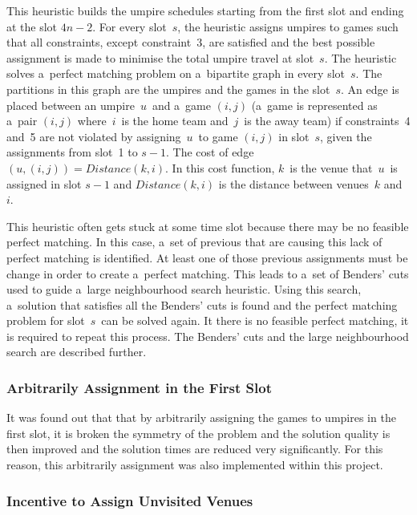\documentclass[a4paper, 10pt, twocolumn]{article}
\begin{document}
    This heuristic builds the umpire schedules starting from the first
    slot and ending at the slot $ 4n - 2 $. For every slot~$ s $, the
    heuristic assigns umpires to games such that all constraints,
    except constraint~3, are satisfied and the best possible assignment
    is made to minimise the total umpire travel at slot~$ s $. The heuristic
    solves a~perfect matching problem on a~bipartite graph in every
    slot~$ s $. The partitions in this graph are the umpires and the games
    in the slot~$ s $. An edge is placed between an umpire~$ u $~and
    a~game $ (i, j) $ (a~game is represented as a~pair $ (i, j) $
    where~$ i $~is the home team and~$ j $~is the away team) if
    constraints~4 and~5 are not violated by assigning~$ u $~to game
    $ (i, j) $ in slot~$ s $, given the assignments from slot~1 to
    $ s - 1 $. The cost of edge $ (u, (i, j)) = Distance(k, i) $. In this
    cost function, $ k $~is the venue that~$ u $~is assigned in slot
    $ s - 1 $ and $ Distance(k, i) $ is the distance between venues~$ k $
    and~$ i $.

    This heuristic often gets stuck at some time slot because there may
    be no feasible perfect matching. In this case, a~set of previous that
    are causing this lack of perfect matching is identified. At least one
    of those previous assignments must be change in order to create
    a~perfect matching. This leads to a~set of Benders' cuts used to
    guide a~large neighbourhood search heuristic. Using this search,
    a~solution that satisfies all the Benders' cuts is found and the
    perfect matching problem for slot~$ s $~can be solved again. It there
    is no feasible perfect matching, it is required to repeat this process.
    The Benders' cuts and the large neighbourhood search are described
    further.


    \subsubsection{Arbitrarily Assignment in the First Slot}

    It was found out that that by arbitrarily assigning the games to
    umpires in the first slot, it is broken the symmetry of the problem
    and the solution quality is then improved and the solution times
    are reduced very significantly. For this reason, this arbitrarily
    assignment was also implemented within this project.

    \subsubsection{Incentive to Assign Unvisited Venues}
\end{document}
